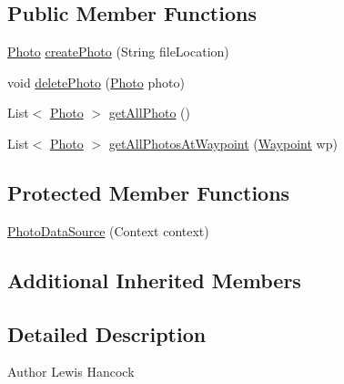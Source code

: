 \subsection*{Public Member Functions}
\begin{DoxyCompactItemize}
\item 
\hyperlink{classuk_1_1ac_1_1swan_1_1digitaltrails_1_1components_1_1_photo}{Photo} \hyperlink{classuk_1_1ac_1_1swan_1_1digitaltrails_1_1database_1_1_photo_data_source_aefd684db05aee6268c1f3152a8aa7890}{create\+Photo} (String file\+Location)
\item 
void \hyperlink{classuk_1_1ac_1_1swan_1_1digitaltrails_1_1database_1_1_photo_data_source_a1a3612d004d35625a839e616f307d16c}{delete\+Photo} (\hyperlink{classuk_1_1ac_1_1swan_1_1digitaltrails_1_1components_1_1_photo}{Photo} photo)
\item 
List$<$ \hyperlink{classuk_1_1ac_1_1swan_1_1digitaltrails_1_1components_1_1_photo}{Photo} $>$ \hyperlink{classuk_1_1ac_1_1swan_1_1digitaltrails_1_1database_1_1_photo_data_source_a5212670aca30b72a4dc70d4b0f0d2b30}{get\+All\+Photo} ()
\item 
List$<$ \hyperlink{classuk_1_1ac_1_1swan_1_1digitaltrails_1_1components_1_1_photo}{Photo} $>$ \hyperlink{classuk_1_1ac_1_1swan_1_1digitaltrails_1_1database_1_1_photo_data_source_ac4656becf989cd3547fd912d8151d77b}{get\+All\+Photos\+At\+Waypoint} (\hyperlink{classuk_1_1ac_1_1swan_1_1digitaltrails_1_1components_1_1_waypoint}{Waypoint} wp)
\end{DoxyCompactItemize}
\subsection*{Protected Member Functions}
\begin{DoxyCompactItemize}
\item 
\hyperlink{classuk_1_1ac_1_1swan_1_1digitaltrails_1_1database_1_1_photo_data_source_a411851791cc208c708ca6208ae41e8a5}{Photo\+Data\+Source} (Context context)
\end{DoxyCompactItemize}
\subsection*{Additional Inherited Members}


\subsection{Detailed Description}
\begin{DoxyAuthor}{Author}
Lewis Hancock 
\end{DoxyAuthor}


